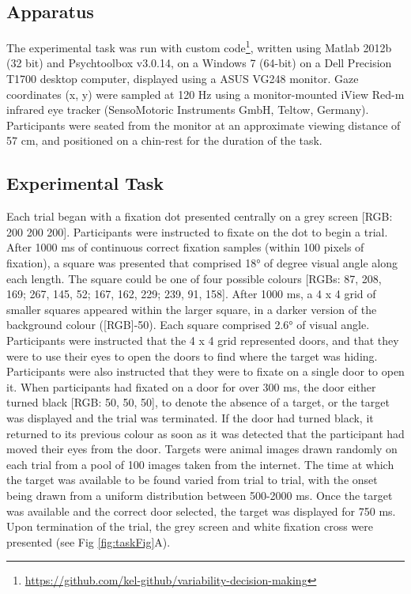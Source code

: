 \documentclass{article}
\begin{document}
\hypertarget{apparatus}{%
\subsection{Apparatus}\label{apparatus}}

The experimental task was run with custom code\footnote{\url{https://github.com/kel-github/variability-decision-making}},
written using Matlab 2012b (32 bit) and Psychtoolbox v3.0.14, on a
Windows 7 (64-bit) on a Dell Precision T1700 desktop computer, displayed
using a ASUS VG248 monitor. Gaze coordinates (x, y) were sampled at 120
Hz using a monitor-mounted iView Red-m infrared eye tracker
(SensoMotoric Instruments GmbH, Teltow, Germany). Participants were
seated from the monitor at an approximate viewing distance of 57 cm, and
positioned on a chin-rest for the duration of the task.

\hypertarget{experimental-task}{%
\subsection{Experimental Task}\label{experimental-task}}

Each trial began with a fixation dot presented centrally on a grey
screen {[}RGB: 200 200 200{]}. Participants were instructed to fixate on
the dot to begin a trial. After 1000 ms of continuous correct fixation
samples (within 100 pixels of fixation), a square was presented that
comprised 18° of degree visual angle along each length. The square could
be one of four possible colours {[}RGBs: 87, 208, 169; 267, 145, 52;
167, 162, 229; 239, 91, 158{]}. After 1000 ms, a 4 x 4 grid of smaller
squares appeared within the larger square, in a darker version of the
background colour ({[}RGB{]}-50). Each square comprised 2.6° of visual
angle. Participants were instructed that the 4 x 4 grid represented
doors, and that they were to use their eyes to open the doors to find
where the target was hiding. Participants were also instructed that they
were to fixate on a single door to open it. When participants had
fixated on a door for over 300 ms, the door either turned black {[}RGB:
50, 50, 50{]}, to denote the absence of a target, or the target was
displayed and the trial was terminated. If the door had turned black, it
returned to its previous colour as soon as it was detected that the
participant had moved their eyes from the door. Targets were animal
images drawn randomly on each trial from a pool of 100 images taken from
the internet. The time at which the target was available to be found
varied from trial to trial, with the onset being drawn from a uniform
distribution between 500-2000 ms. Once the target was available and the
correct door selected, the target was displayed for 750 ms. Upon
termination of the trial, the grey screen and white fixation cross were
presented (see Fig \ref{fig:taskFig}A).
\end{document}
